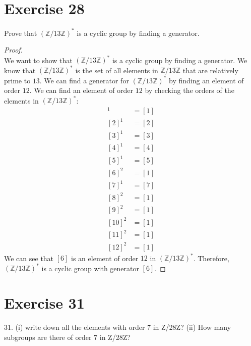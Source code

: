 \documentclass{article}
\begin{document}
    \section*{Exercise 28}
     Prove that $(\mathbb{Z}/13\mathbb{Z})^*$ is a cyclic group by finding a generator.



\begin{proof}
    \leavevmode \\
    We want to show that $(\mathbb{Z}/13\mathbb{Z})^*$ is a cyclic group by finding a generator. We know that $(\mathbb{Z}/13\mathbb{Z})^*$ is the set of all elements in $\mathbb{Z}/13\mathbb{Z}$ that are relatively prime to $13$. We can find a generator for $(\mathbb{Z}/13\mathbb{Z})^*$ by finding an element of order $12$. We can find an element of order $12$ by checking the orders of the elements in $(\mathbb{Z}/13\mathbb{Z})^*$:
    \begin{align*}
        [1]^1 &= [1] \\
        [2]^1 &= [2] \\
        [3]^1 &= [3] \\
        [4]^1 &= [4] \\
        [5]^1 &= [5] \\
        [6]^2 &= [1] \\
        [7]^1 &= [7] \\
        [8]^2 &= [1] \\
        [9]^2 &= [1] \\
        [10]^2 &= [1] \\
        [11]^2 &= [1] \\
        [12]^2 &= [1]
    \end{align*}
    We can see that $[6]$ is an element of order $12$ in $(\mathbb{Z}/13\mathbb{Z})^*$. Therefore, $(\mathbb{Z}/13\mathbb{Z})^*$ is a cyclic group with generator $[6]$.
\end{proof}


\section*{Exercise 31}
31. (i) write down all the elements with order 7 in Z/28Z?
(ii) How many subgroups are there of order 7 in Z/28Z?
\end{document}
